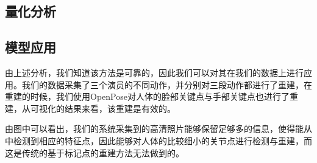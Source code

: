 \subsection{量化分析}

\subsection{模型应用}

由上述分析，我们知道该方法是可靠的，因此我们可以对其在我们的数据上进行应用。我们的数据采集了三个演员的不同动作，并分别对三段动作都进行了重建，在重建的时候，我们使用OpenPose对人体的脸部关键点与手部关键点也进行了重建，从可视化的结果来看，该重建是有效的。

由图中可以看出，我们的系统采集到的高清照片能够保留足够多的信息，使得能从中检测到相应的特征点，因此能够对人体的比较细小的关节点进行检测与重建，而这是传统的基于标记点的重建方法无法做到的。

